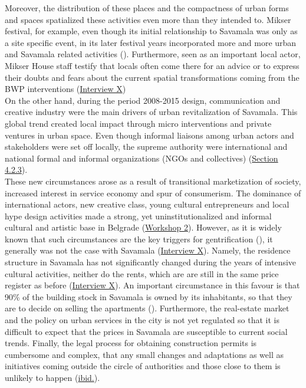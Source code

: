 \documentclass[11pt]{report}
\begin{document}
Moreover, the distribution of these places and the compactness of urban forms and spaces spatialized these activities even more than they intended to.
Mikser festival, for example, even though its initial relationship to Savamala was only as a site specific event, in its later festival years incorporated more and more urban and Savamala related activities
(\cite{(check ref  web The Game of Savamala and XXXX, Mikser Festival 2014)}).
Furthermore, seen as an important local actor, Mikser House staff testify that locals often come there for an advice or to express their doubts and fears about the current spatial transformations coming from the BWP interventions 
(\href{InterviewX}{Interview X})
\\

On the other hand, during the period 2008-2015 design, communication and creative industry were the main drivers of urban revitalization of Savamala.
This global trend created local impact through micro interventions and private ventures in urban space.
Even though informal liaisons among urban actors and stakeholders were set off locally, the supreme  authority were international and national formal and informal organizations (NGOs and collectives) (\href{Section 4.2.3}{Section 4.2.3}). %
\\

These new circumstances arose as a result of transitional marketization of society, increased interest in service economy and spur of consumerism.
The dominance of international actors, new creative class, young cultural entrepreneurs and local hype design activities made a strong, yet uninstitutionalized and informal cultural and artistic base in Belgrade (\href{PHD Workshop}{Workshop 2}).
However, as it is widely known that such circumstances are the key triggers for gentrification (\citealt{krusche_gentrification_2015}),
it generally was not the case with Savamala (\href{InterviewX}{Interview X}).
Namely, the residence structure in Savamala has not significantly changed during the years of intensive cultural activities, neither do the rents, which are are still in the same price register as before (\href{InterviewX}{Interview X}).
An important circumstance in this favour is that 90\% of the building stock in Savamala is owned by its inhabitants, so that they are to decide on selling the apartments (\citealt{krusche_role_2015}).
Furthermore, the real-estate market and the policy on urban services in the city is not yet regulated so that it is difficult to expect that the prices in Savamala are susceptible to current social trends.
Finally, the legal process for obtaining construction permits is cumbersome and complex, that any small changes and adaptations as well as initiatives coming outside the circle of authorities and those close to them is unlikely to happen (\href{Klaus}{ibid.}).
\\
\end{document}
